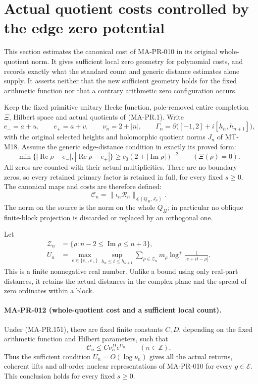 \section{Actual quotient costs controlled by the edge zero potential}
\label{sec:edge-potential-quotient-cost}

This section estimates the canonical cost of MA-PR-010 in its
original whole-quotient norm.  It gives sufficient local zero
geometry for polynomial costs, and records exactly what the
standard count and generic distance estimates alone supply.
It asserts neither that the new sufficient geometry holds
for the fixed arithmetic function nor that a contrary
arithmetic zero configuration occurs.

Keep the fixed primitive unitary Hecke function, pole-removed
entire completion \(\Xi\), Hilbert space and actual quotients
of (MA-PR.1).  Write
\[
 e_-=a+u,\qquad e_+=a+v,\qquad \nu_n=2+|n|,
 \qquad
 \Gamma_n=\partial\bigl([-1,2]+i[h_n,h_{n+1}]\bigr),
 \tag{MA-PR.150}
\]
with the original selected heights and holomorphic quotient
norms \(J_n\) of MT-M18.  Assume the generic edge-distance
condition in exactly its proved form:
\[
 \min\{|\operatorname{Re}\rho-e_-|,
               |\operatorname{Re}\rho-e_+|\}
       \ge c_0(2+|\operatorname{Im}\rho|)^{-2}
                     \qquad(\Xi(\rho)=0).
 \tag{MA-PR.151}
\]
All zeros are counted with their actual multiplicities.
There are no boundary zeros, so every retained primary
factor is retained in full, for every fixed \(s\ge0\).
The canonical maps and costs are therefore defined:
\[
 \mathcal C_n
   =\|\iota_n\mathscr R_n\|_{\mathcal L(Q_H,J_n)}.
 \tag{MA-PR.152}
\]
The norm on the source is the norm on the whole \(Q_H\);
in particular no oblique finite-block projection is
discarded or replaced by an orthogonal one.

Let
\[
 \begin{split}
 \mathcal Z_n&=\{\rho:n-2\le\operatorname{Im}\rho\le n+3\},\\
 U_n&=\max_{e\in\{e_-,e_+\}}
       \sup_{h_n\le t\le h_{n+1}}
       \sum_{\rho\in\mathcal Z_n}m_\rho
             \log^+\frac1{|e+it-\rho|}.
 \end{split}
 \tag{MA-PR.153}
\]
This is a finite nonnegative real number.  Unlike a
bound using only real-part distances, it retains the
actual distances in the complex plane and the spread
of zero ordinates within a block.

\paragraph{MA-PR-012 (whole-quotient cost and a sufficient local count).}
Under (MA-PR.151), there are fixed finite constants
\(C,D\), depending on the fixed arithmetic function
and Hilbert parameters, such that
\[
                    \mathcal C_n\le C\nu_n^D e^{U_n}
                                   \qquad(n\in\mathbb Z).
 \tag{MA-PR.154}
\]
Thus the sufficient condition \(U_n=O(\log\nu_n)\)
gives all the actual returns, coherent lifts and
all-order nuclear representations of MA-PR-010
for every \(g\in\mathcal E\).
This conclusion holds for every fixed \(s\ge0\).

